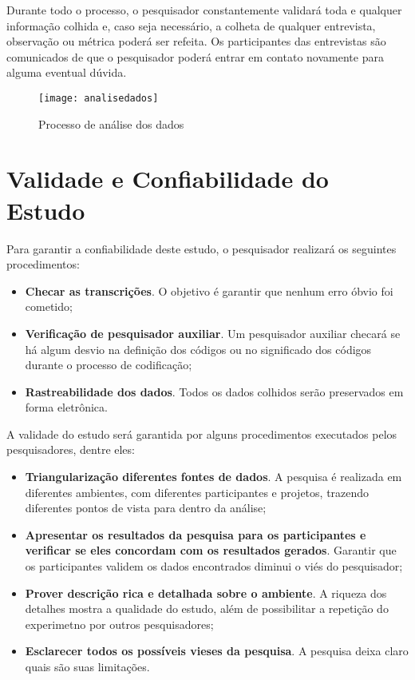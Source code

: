 Durante todo o processo, o pesquisador constantemente validará toda e qualquer
informação colhida e, caso seja necessário, a colheta de qualquer entrevista,
observação ou métrica poderá ser refeita. Os participantes das entrevistas
são comunicados de que o pesquisador poderá entrar em contato
novamente para alguma eventual dúvida.

\begin{figure}
  \centering
  \texttt{[image: analisedados]}
  \caption{Processo de análise dos dados}
  \label{fig:analise-dados}
\end{figure}

\section{Validade e Confiabilidade do Estudo}
\label{sec:planejamento-validacao}

Para garantir a confiabilidade deste estudo, o pesquisador realizará os
seguintes procedimentos:

\begin{itemize}
	\item \textbf{Checar as transcrições}. O objetivo é garantir que nenhum erro
	óbvio foi cometido;

	\item \textbf{Verificação de pesquisador auxiliar}. Um pesquisador auxiliar
	checará se há algum desvio na definição dos códigos ou no significado dos códigos 
	durante o processo de codificação;
	
	\item \textbf{Rastreabilidade dos dados}. Todos os dados colhidos serão
	preservados em forma eletrônica.

\end{itemize}

A validade do estudo será garantida por alguns procedimentos executados pelos
pesquisadores, dentre eles:

\begin{itemize}
	\item \textbf{Triangularização diferentes fontes de dados}. A pesquisa é
	realizada em diferentes ambientes, com diferentes participantes e projetos,
	trazendo diferentes pontos de vista para dentro da análise;

	\item \textbf{Apresentar os resultados da pesquisa para os participantes e
	verificar se eles concordam com os resultados gerados}. Garantir que os
	participantes validem os dados encontrados diminui o viés do pesquisador;

	\item \textbf{Prover descrição rica e detalhada sobre o ambiente}. A riqueza
	dos detalhes mostra a qualidade do estudo, além de possibilitar a repetição do
	experimetno por outros pesquisadores;

	\item \textbf{Esclarecer todos os possíveis vieses da pesquisa}. A pesquisa
	deixa claro quais são suas limitações.

\end{itemize}

